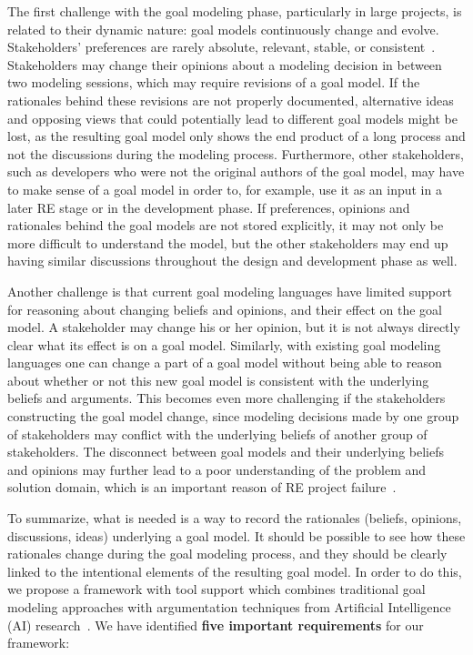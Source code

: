 The first challenge with the goal modeling phase, particularly in large projects, is related to their dynamic nature: goal models continuously change and evolve. Stakeholders' preferences are rarely absolute, relevant, stable, or consistent~\cite{march1978bounded}. Stakeholders may change their opinions about a modeling decision in between two modeling sessions, which may require revisions of a goal model. If the rationales behind these revisions are not properly documented, alternative ideas and opposing views that could potentially lead to different goal models might be lost, as the resulting goal model only shows the end product of a long process and not the discussions during the modeling process. Furthermore, other stakeholders, such as developers who were not the original authors of the goal model, may have to make sense of a goal model in order to, for example, use it as an input in a later RE stage or in the development phase. If preferences, opinions and rationales behind the goal models are not stored explicitly, it may not only be more difficult to understand the model, but the other stakeholders may end up having similar discussions throughout the design and development phase as well.

Another challenge is that current goal modeling languages have limited support for reasoning about changing beliefs and opinions, and their effect on the goal model. A stakeholder may change his or her opinion, but it is not always directly clear what its effect is on a goal model. Similarly, with existing goal modeling languages one can change a part of a goal model without being able to reason about whether or not this new goal model is consistent with the underlying beliefs and arguments. This becomes even more challenging if the stakeholders constructing the goal model change, since modeling decisions made by one group of stakeholders may conflict with the underlying beliefs of another group of stakeholders. The disconnect between goal models and their underlying beliefs and opinions may further lead to a poor understanding of the problem and solution domain, which is an important reason of RE project failure~\cite{curtis1988field}. 

To summarize, what is needed is a way to record the rationales (beliefs, opinions, discussions, ideas) underlying a goal model. It should be possible to see how these rationales change during the goal modeling process, and they  should be clearly linked to the intentional elements of the resulting goal model. In order to do this, we propose a framework with tool support which combines traditional goal modeling approaches with argumentation techniques from Artificial Intelligence (AI) research~\cite{BenchCaponDunne2007}. We have identified \textbf{five important requirements} for our framework: 

